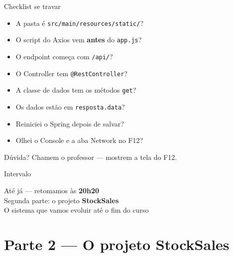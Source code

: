 \documentclass[aspectratio=169,11pt]{beamer}
\begin{document}
\begin{frame}{Checklist se travar}
  \begin{itemize}
    \item [ ] A pasta é \texttt{src/main/resources/static/}?
    \item [ ] O script do Axios vem \textbf{antes} do \texttt{app.js}?
    \item [ ] O endpoint começa com \texttt{/api/}?
    \item [ ] O Controller tem \texttt{@RestController}?
    \item [ ] A classe de dados tem os métodos \texttt{get}?
    \item [ ] Os dados estão em \texttt{resposta.data}?
    \item [ ] Reiniciei o Spring depois de salvar?
    \item [ ] Olhei o Console e a aba Network no F12?
  \end{itemize}

  \vspace{0.6em}
  Dúvida? Chamem o professor --- mostrem a tela do F12.
\end{frame}

\begin{frame}{Intervalo}
  \begin{center}
    \Large Até já --- retomamos às \textbf{20h20}\\[0.8em]
    \normalsize
    Segunda parte: o projeto \textbf{StockSales}\\
    O sistema que vamos evoluir até o fim do curso
  \end{center}
\end{frame}

\section{Parte 2 --- O projeto StockSales}
\end{document}
